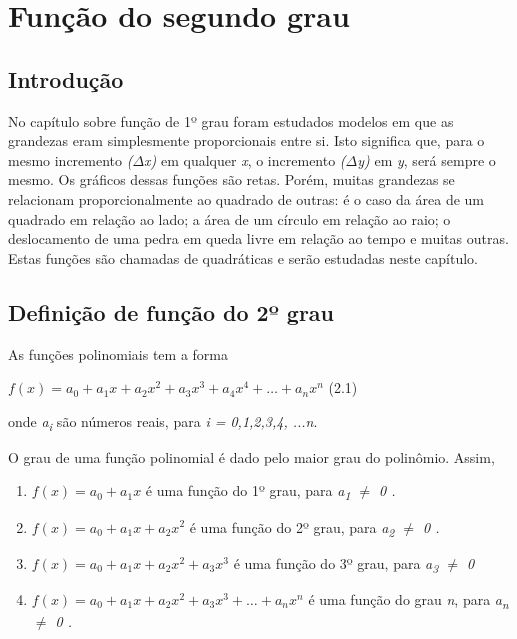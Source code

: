 \chapter{Função do segundo grau}

\section{Introdução}

No capítulo sobre função de 1º grau foram estudados modelos em que as grandezas eram simplesmente proporcionais entre si. Isto significa que, para o mesmo incremento \textit{($\Delta$x) }em qualquer \textit{x}, o incremento \textit{($\Delta$y) }em \textit{y}, será sempre o mesmo. Os gráficos dessas funções são retas. Porém, muitas grandezas se relacionam proporcionalmente ao quadrado de outras: é o caso da área de um quadrado em relação ao lado; a área de um círculo em relação ao raio; o deslocamento de uma pedra em queda livre em relação ao tempo e muitas outras. Estas funções são chamadas de quadráticas e serão estudadas neste capítulo. 

\section{Definição de função do 2º grau }

As funções polinomiais tem a forma 

 \( f \left( x \right) =a_{0}+a_{1}x+a_{2}x^{2}+a_{3}x^{3}+a_{4}x^{4}+ \ldots +a_{n}x^{n} \) (2.1)

onde \textit{a\textsubscript{i}} são números reais, para \textit{i = 0,1,2,3,4, ...n}.

O grau de uma função polinomial é dado pelo maior grau do polinômio. Assim,

\begin{enumerate}
	\item  \( f \left( x \right) = a_{0}+a_{1}x \)    é uma função do 1º grau, para    \textit{a\textsubscript{1} $ \neq $  0  .}

	\item  \( f \left( x \right) =a_{0}+a_{1}x+a_{2}x^{2} \)    é uma função do 2º grau, para    \textit{a\textsubscript{2} $ \neq $  0 . }

	\item  \( f \left( x \right) =a_{0}+a_{1}x+a_{2}x^{2}+a_{3}x^{3} \)    é uma função do 3º grau, para    \textit{a\textsubscript{3} $ \neq $  0  }

	\item  \( f \left( x \right) =a_{0}+a_{1}x+a_{2}x^{2}+a_{3}x^{3}+ \ldots +a_{n}x^{n} \)       é uma função do grau \textit{n}, para    \textit{a\textsubscript{n} $ \neq $  0  .}
\end{enumerate}

